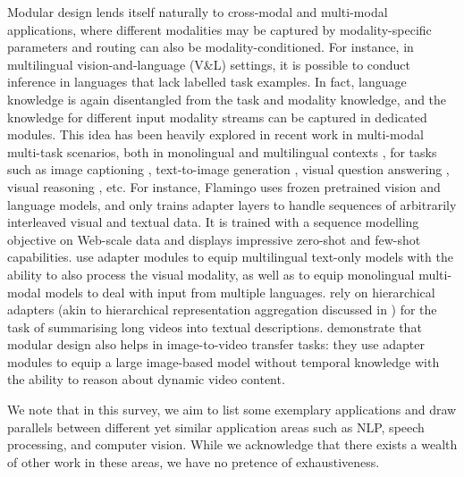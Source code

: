Modular design lends itself naturally to cross-modal and multi-modal applications, where different modalities may be captured by modality-specific parameters and routing can also be modality-conditioned. For instance, in multilingual vision-and-language (V\&L) settings, it is possible to conduct inference in languages that lack labelled task examples. In fact, language knowledge is again disentangled from the task and modality knowledge, and the knowledge for different input modality streams can be captured in dedicated modules. This idea has been heavily explored in recent work in multi-modal multi-task scenarios, both in monolingual \citep{Sung:2022modal} and multilingual contexts \citep{bugliarello2022iglue,pfeiffer-etal-2022-xgqa}, for tasks such as image captioning \citep{Zhou:2022modal,Gao:2021modal}, text-to-image generation \citep{Maharana:2022modal}, visual question answering \citep{Liu:2022delving,Sung:2022modal}, visual reasoning \citep{liu-etal-2021-visually}, etc. For instance, Flamingo \citep{alayrac2022flamingo} uses frozen pretrained vision and language models, and only trains adapter layers to handle sequences of arbitrarily interleaved visual and textual data. It is trained with a sequence modelling objective on Web-scale data \citep{li2021align} and displays impressive zero-shot and few-shot capabilities. \cite{pfeiffer-etal-2022-xgqa} use adapter modules to equip multilingual text-only models with the ability to also process the visual modality, as well as to equip monolingual multi-modal models to deal with input from multiple languages. \citet{Papalampidi:2022modal} rely on hierarchical adapters (akin to hierarchical representation aggregation discussed in ) for the task of summarising long videos into textual descriptions. \citet{Pan:2022modal} demonstrate that modular design also helps in image-to-video transfer tasks: they use adapter modules to equip a large image-based model without temporal knowledge with the ability to reason about dynamic video content. 

We note that in this survey, we aim to list some exemplary applications and draw parallels between different yet similar application areas such as NLP, speech processing, and computer vision. While we acknowledge that there exists a wealth of other work in these areas, we have no pretence of exhaustiveness.



